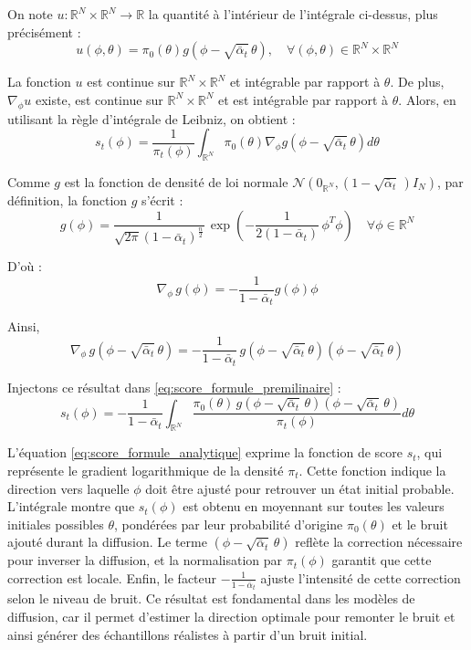 \documentclass[a4paper,10pt]{article}
\theoremstyle{definition} %
\theoremstyle{definition} %
\theoremstyle{definition} %
\theoremstyle{definition} %
\newcommand{\R}{\mathbb{R}}
\begin{document}
On note $u: \R^N \times \R^N \rightarrow \R$ la quantité à l'intérieur de l'intégrale ci-dessus, plus précisément :
\[u(\phi,\theta) =  \pi_0(\theta) g(\phi - \sqrt{\bar \alpha_t}\,\theta), \quad \forall (\phi,\theta) \in \R^N \times \R^N\]

La fonction $u$ est continue sur $\R^N \times \R^N$ et intégrable par rapport à $\theta$. De plus, $\nabla_\phi u$ existe, est continue sur $\R^N \times \R^N$ et est intégrable par rapport à $\theta$. Alors, en utilisant la règle d'intégrale de Leibniz, on obtient :
\begin{equation}\label{eq:score_formule_premilinaire}
    s_t(\phi) = \frac{1}{\pi_t(\phi)} \int_{\R^N} \pi_0(\theta) \nabla_\phi g(\phi - \sqrt{\bar \alpha_t} \,\theta) d\theta 
\end{equation}

Comme $g$ est la fonction de densité de loi normale $\mathcal{N}\left(0_{\R^N}, (1-\sqrt{\bar \alpha _t} \,)I_N\right)$, par définition, la fonction $g$ s'écrit :
\begin{equation*}
    g(\phi) = \frac{1}{\sqrt{2\pi}(1-\bar \alpha_t)^{\frac{n}{2}}} \, \exp\left(-\frac{1}{2(1-\bar \alpha _t)}\,\phi^T\phi\right) \quad \forall \phi \in \R^N
\end{equation*}

D'où :
\begin{equation*}
    \nabla_\phi \,g(\phi) = -\frac{1}{1-\bar \alpha_t}g(\phi)\phi
\end{equation*}

Ainsi,
\begin{equation*}
    \nabla_\phi \,g(\phi - \sqrt{\bar \alpha_t} \,\theta) = -\frac{1}{1-\bar \alpha_t}\,g(\phi - \sqrt{\bar \alpha_t} \,\theta)(\phi - \sqrt{\bar \alpha_t} \,\theta)
\end{equation*}

Injectons ce résultat dans \cref{eq:score_formule_premilinaire} :
\begin{equation}\label{eq:score_formule_analytique}
    s_t(\phi) = -\frac{1}{1- \bar \alpha_t} \int_{\R^N} \frac{\pi_0(\theta)\, g(\phi - \sqrt{\bar \alpha_t} \,\theta)(\phi - \sqrt{\bar \alpha_t} \,\theta)}{\pi_t(\phi)} d\theta
\end{equation}

L'équation \eqref{eq:score_formule_analytique} exprime la fonction de score \(s_t\), qui représente le gradient logarithmique de la densité \(\pi_t\). Cette fonction indique la direction vers laquelle \(\phi\) doit être ajusté pour retrouver un état initial probable. L'intégrale montre que \(s_t(\phi)\) est obtenu en moyennant sur toutes les valeurs initiales possibles \(\theta\), pondérées par leur probabilité d'origine \(\pi_0(\theta)\) et le bruit ajouté durant la diffusion. Le terme \((\phi - \sqrt{\bar{\alpha}_t}\, \theta)\) reflète la correction nécessaire pour inverser la diffusion, et la normalisation par \(\pi_t(\phi)\) garantit que cette correction est locale. Enfin, le facteur \(-\frac{1}{1- \bar \alpha_t}\) ajuste l'intensité de cette correction selon le niveau de bruit. Ce résultat est fondamental dans les modèles de diffusion, car il permet d'estimer la direction optimale pour remonter le bruit et ainsi générer des échantillons réalistes à partir d’un bruit initial.
\end{document}
